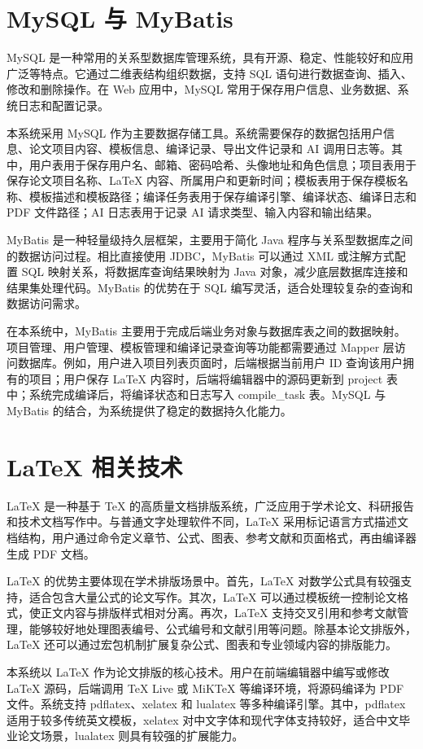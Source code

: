 \documentclass{xduugthesis}
\begin{document}
\section{MySQL 与 MyBatis}
MySQL 是一种常用的关系型数据库管理系统，具有开源、稳定、性能较好和应用广泛等特点。它通过二维表结构组织数据，支持 SQL 语句进行数据查询、插入、修改和删除操作。在 Web 应用中，MySQL 常用于保存用户信息、业务数据、系统日志和配置记录。

本系统采用 MySQL 作为主要数据存储工具。系统需要保存的数据包括用户信息、论文项目内容、模板信息、编译记录、导出文件记录和 AI 调用日志等。其中，用户表用于保存用户名、邮箱、密码哈希、头像地址和角色信息；项目表用于保存论文项目名称、LaTeX 内容、所属用户和更新时间；模板表用于保存模板名称、模板描述和模板路径；编译任务表用于保存编译引擎、编译状态、编译日志和 PDF 文件路径；AI 日志表用于记录 AI 请求类型、输入内容和输出结果。

MyBatis 是一种轻量级持久层框架，主要用于简化 Java 程序与关系型数据库之间的数据访问过程。相比直接使用 JDBC，MyBatis 可以通过 XML 或注解方式配置 SQL 映射关系，将数据库查询结果映射为 Java 对象，减少底层数据库连接和结果集处理代码。MyBatis 的优势在于 SQL 编写灵活，适合处理较复杂的查询和数据访问需求。

在本系统中，MyBatis 主要用于完成后端业务对象与数据库表之间的数据映射。项目管理、用户管理、模板管理和编译记录查询等功能都需要通过 Mapper 层访问数据库。例如，用户进入项目列表页面时，后端根据当前用户 ID 查询该用户拥有的项目；用户保存 LaTeX 内容时，后端将编辑器中的源码更新到 project 表中；系统完成编译后，将编译状态和日志写入 compile\_task 表。MySQL 与 MyBatis 的结合，为系统提供了稳定的数据持久化能力。

\section{LaTeX 相关技术}
LaTeX 是一种基于 TeX 的高质量文档排版系统，广泛应用于学术论文、科研报告和技术文档写作中。与普通文字处理软件不同，LaTeX 采用标记语言方式描述文档结构，用户通过命令定义章节、公式、图表、参考文献和页面格式，再由编译器生成 PDF 文档。

LaTeX 的优势主要体现在学术排版场景中。首先，LaTeX 对数学公式具有较强支持，适合包含大量公式的论文写作\cite{ye2018latex}。其次，LaTeX 可以通过模板统一控制论文格式，使正文内容与排版样式相对分离。再次，LaTeX 支持交叉引用和参考文献管理，能够较好地处理图表编号、公式编号和文献引用等问题。除基本论文排版外，LaTeX 还可以通过宏包机制扩展复杂公式、图表和专业领域内容的排版能力\cite{strokov1998macropackage}。

本系统以 LaTeX 作为论文排版的核心技术。用户在前端编辑器中编写或修改 LaTeX 源码，后端调用 TeX Live 或 MiKTeX 等编译环境，将源码编译为 PDF 文件。系统支持 pdflatex、xelatex 和 lualatex 等多种编译引擎。其中，pdflatex 适用于较多传统英文模板，xelatex 对中文字体和现代字体支持较好，适合中文毕业论文场景，lualatex 则具有较强的扩展能力。
\end{document}
